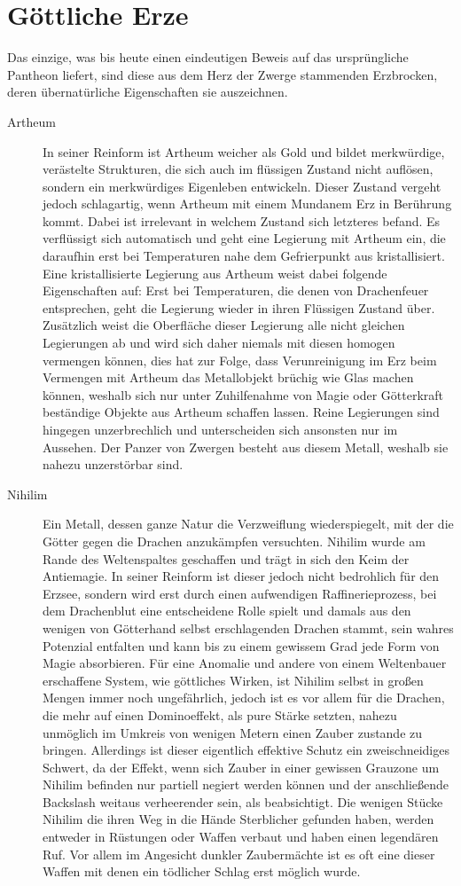 \documentclass[a4paper,12pt,oneside]{book}
\begin{document}
\section{Göttliche Erze}
Das einzige, was bis heute einen eindeutigen Beweis auf das ursprüngliche Pantheon liefert, sind diese aus dem Herz der Zwerge stammenden Erzbrocken, deren übernatürliche Eigenschaften sie auszeichnen.
\begin{description}
\item[Artheum]In seiner Reinform ist Artheum weicher als Gold und bildet merkwürdige, verästelte Strukturen, die sich auch im flüssigen Zustand nicht auflösen, sondern ein merkwürdiges Eigenleben entwickeln. Dieser Zustand vergeht jedoch schlagartig, wenn Artheum mit einem Mundanem Erz in Berührung kommt. Dabei ist irrelevant in welchem Zustand sich letzteres befand. Es verflüssigt sich automatisch und geht eine Legierung mit Artheum ein, die daraufhin erst bei Temperaturen nahe dem Gefrierpunkt aus kristallisiert. Eine kristallisierte Legierung aus Artheum weist dabei folgende Eigenschaften auf: Erst bei Temperaturen, die denen von Drachenfeuer entsprechen, geht die Legierung wieder in ihren Flüssigen Zustand über. Zusätzlich weist die Oberfläche dieser Legierung alle nicht gleichen Legierungen ab und wird sich daher niemals mit diesen homogen vermengen können, dies hat zur Folge, dass Verunreinigung im Erz beim Vermengen mit Artheum das Metallobjekt brüchig wie Glas machen können, weshalb sich nur unter Zuhilfenahme von Magie oder Götterkraft beständige Objekte aus Artheum schaffen lassen. Reine Legierungen sind hingegen unzerbrechlich und unterscheiden sich ansonsten nur im Aussehen. Der Panzer von Zwergen besteht aus diesem Metall, weshalb sie nahezu unzerstörbar sind.
\item[Nihilim]Ein Metall, dessen ganze Natur die Verzweiflung wiederspiegelt, mit der die Götter gegen die Drachen anzukämpfen versuchten. Nihilim wurde am Rande des Weltenspaltes geschaffen und trägt in sich den Keim der Antiemagie. In seiner Reinform ist dieser jedoch nicht bedrohlich für den Erzsee, sondern wird erst durch einen aufwendigen Raffinerieprozess, bei dem Drachenblut eine entscheidene Rolle spielt und damals aus den wenigen von Götterhand selbst erschlagenden Drachen stammt, sein wahres Potenzial entfalten und kann bis zu einem gewissem Grad jede Form von Magie absorbieren. Für eine Anomalie und andere von einem Weltenbauer erschaffene System, wie göttliches Wirken, ist Nihilim selbst in großen Mengen immer noch ungefährlich, jedoch ist es vor allem für die Drachen, die mehr auf einen Dominoeffekt, als pure Stärke setzten, nahezu unmöglich im Umkreis von wenigen Metern einen Zauber zustande zu bringen. Allerdings ist dieser eigentlich effektive Schutz ein zweischneidiges Schwert, da der Effekt, wenn sich Zauber in einer gewissen Grauzone um Nihilim befinden nur partiell negiert werden können und der anschließende Backslash weitaus verheerender sein, als beabsichtigt. Die wenigen Stücke Nihilim die ihren Weg in die Hände Sterblicher gefunden haben, werden entweder in Rüstungen oder Waffen verbaut und haben einen legendären Ruf. Vor allem im Angesicht dunkler Zaubermächte ist es oft eine dieser Waffen mit denen ein tödlicher Schlag erst möglich wurde.

\end{description}
\end{document}
